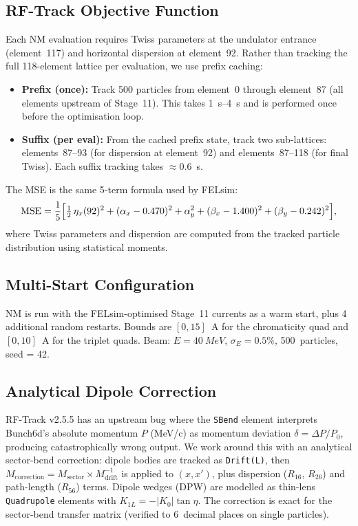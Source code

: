 \documentclass[11pt]{article}
\begin{document}
\subsection{RF-Track Objective Function}

Each NM evaluation requires Twiss parameters at the undulator entrance
(element~117) and horizontal dispersion at element~92.  Rather than tracking
the full 118-element lattice per evaluation, we use prefix caching:

\begin{itemize}
  \item \textbf{Prefix (once):} Track 500 particles from element~0 through
    element~87 (all elements upstream of Stage~11).  This takes
    \SIrange{1}{4}{s} and is performed once before the optimisation loop.
  \item \textbf{Suffix (per eval):} From the cached prefix state, track two
    sub-lattices: elements~87--93 (for dispersion at element~92) and
    elements~87--118 (for final Twiss).  Each suffix tracking takes
    $\approx$\SI{0.6}{s}.
\end{itemize}

The MSE is the same 5-term formula used by FELsim:
\begin{equation}
  \text{MSE} = \frac{1}{5}\Bigl[
    \tfrac{1}{2}\,\eta_x(92)^2
    + (\alpha_x - 0.470)^2
    + \alpha_y^2
    + (\beta_x - 1.400)^2
    + (\beta_y - 0.242)^2
  \Bigr],
\end{equation}
where Twiss parameters and dispersion are computed from the tracked particle
distribution using statistical moments.

\subsection{Multi-Start Configuration}

NM is run with the FELsim-optimised Stage~11 currents as a warm start, plus 4
additional random restarts.  Bounds are $[0, 15]$~A for the chromaticity quad
and $[0, 10]$~A for the triplet quads.  Beam: $E = \SI{40}{MeV}$,
$\sigma_E = 0.5\%$, 500~particles, seed = 42.

\subsection{Analytical Dipole Correction}

RF-Track v2.5.5 has an upstream bug where the \texttt{SBend} element interprets
Bunch6d's absolute momentum $P$ (MeV/c) as momentum deviation $\delta = \Delta P / P_0$,
producing catastrophically wrong output.  We work around this with an analytical
sector-bend correction: dipole bodies are tracked as \texttt{Drift(L)}, then
$M_\text{correction} = M_\text{sector} \times M_\text{drift}^{-1}$ is applied
to $(x, x')$, plus dispersion ($R_{16}$, $R_{26}$) and path-length ($R_{56}$)
terms.  Dipole wedges (DPW) are modelled as thin-lens \texttt{Quadrupole}
elements with $K_{1L} = -|K_0| \tan\eta$.  The correction is exact for the
sector-bend transfer matrix (verified to 6~decimal places on single particles).
\end{document}
